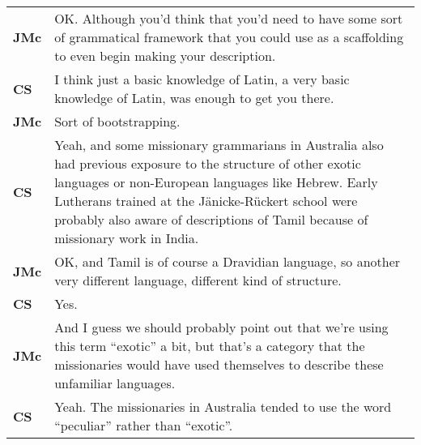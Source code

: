 \documentclass[12pt]{article}
\begin{document}
\begin{flushleft}
\begin{supertabular}{m{0.24415985in}m{5.89766in}}
\textbf{JMc} &
OK. Although you’d think that you’d need to have some sort of grammatical framework that you could use as a scaffolding to even begin making your description.\\
\textbf{CS}\newline
 &
I think just a basic knowledge of Latin, a very basic knowledge of Latin, was enough to get you there.\\
\textbf{JMc}\newline
 &
Sort of bootstrapping.\\
\textbf{CS}\newline
 &
Yeah, and some missionary grammarians in Australia also had previous exposure to the structure of other exotic languages or non-European languages like Hebrew. Early Lutherans trained at the Jänicke-Rückert school were probably also aware of descriptions of Tamil because of missionary work in India.\\
\textbf{JMc}\newline
 &
OK, and Tamil is of course a Dravidian language, so another very different language, different kind of structure.\\
\textbf{CS}\newline
 &
Yes.\\
\textbf{JMc}\newline
 &
And I guess we should probably point out that we’re using this term “exotic” a bit, but that’s a category that the missionaries would have used themselves to describe these unfamiliar languages.\\
\textbf{CS}\newline
 &
Yeah. The missionaries in Australia tended to use the word “peculiar” rather than “exotic”.


\end{supertabular}
\end{flushleft}
\end{document}
